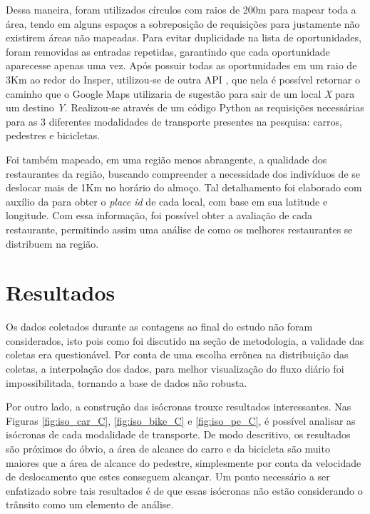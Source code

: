 Dessa maneira, foram utilizados círculos com raios de 200m para mapear toda a área, tendo em alguns espaços a sobreposição de requisições para justamente não existirem áreas não mapeadas. Para evitar duplicidade na lista de oportunidades, foram removidas as entradas repetidas, garantindo que cada oportunidade aparecesse apenas uma vez.
Após possuir todas as oportunidades em um raio de 3Km ao redor do Insper, utilizou-se de outra API , que nela é possível retornar o caminho que o Google Maps utilizaria de sugestão para sair de um local \textit{X} para um destino \textit{Y}. Realizou-se através de um código Python as requisições necessárias para as 3 diferentes modalidades de transporte presentes na pesquisa: carros, pedestres e bicicletas.

Foi também mapeado, em uma região menos abrangente, a qualidade dos restaurantes da região, buscando compreender a necessidade dos indivíduos de se deslocar mais de 1Km no horário do almoço. Tal detalhamento foi elaborado com auxílio da  para obter o \textit{place id} de cada local, com base em sua latitude e longitude. Com essa informação, foi possível obter a avaliação de cada restaurante, permitindo assim uma análise de como os melhores restaurantes se distribuem na região.

\section{Resultados}
Os dados coletados durante as contagens ao final do estudo não foram considerados, isto pois como foi discutido na seção de metodologia, a validade das coletas era questionável. Por conta de uma escolha errônea na distribuição das coletas, a interpolação dos dados, para melhor visualização do fluxo diário foi impossibilitada, tornando a base de dados não robusta.

Por outro lado, a construção das isócronas trouxe resultados interessantes. Nas Figuras \ref{fig:iso_car_C}, \ref{fig:iso_bike_C} e \ref{fig:iso_pe_C}, é possível analisar as isócronas de cada modalidade de transporte. De modo descritivo, os resultados são próximos do óbvio, a área de alcance do carro e da bicicleta são muito maiores que a área de alcance do pedestre, simplesmente por conta da velocidade de deslocamento que estes conseguem alcançar. Um ponto necessário a ser enfatizado sobre tais resultados é de que essas isócronas não estão considerando o trânsito como um elemento de análise.

